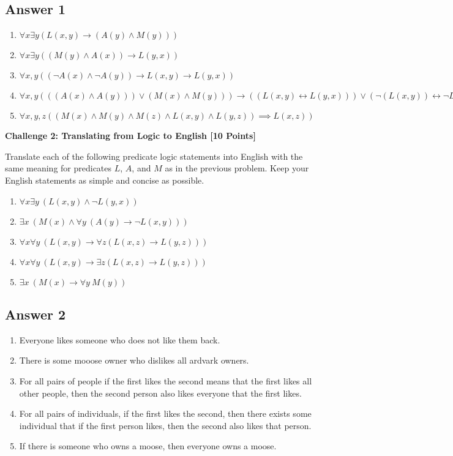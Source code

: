 \documentclass[12pt]{article}
\newcommand{\AND}{\wedge}
\newcommand{\OR}{\vee}
\newcommand{\IMPLIES}{\rightarrow}
\newcommand{\Problem}[3]{\mbox{} \newline \noindent \textbf{\textbf{Challenge #1: #2 [#3 Points] \\ }}}
\begin{document}
\subsection*{Answer 1}
\begin{enumerate}
	\item $\forall x \exists y (L(x,y) \IMPLIES  (A(y) \AND M(y)))$
	\item $\forall x \exists y ((M(y) \AND A(x))\IMPLIES L(y,x))$
	\item $\forall x, y ((\neg A(x) \AND \neg A(y)) \IMPLIES L(x,y) \IMPLIES L(y,x))$
	\item $ \forall x, y (((A(x) \AND A(y))) \OR (M(x) \AND M(y)))\IMPLIES ((L(x,y) \leftrightarrow L(y,x))) \OR (\neg (L(x,y)) \leftrightarrow \neg L(y,x)))$
	\item $ \forall x,y,z ((M(x)\AND M(y)\AND M(z) \AND L(x,y) \AND L(y,z))\implies L(x,z) )$
\end{enumerate}

\Problem{2}{Translating from Logic to English}{10}

Translate each of the following predicate logic statements into English with the same meaning for predicates $L$, $A$, and $M$ as in the previous problem.  Keep your English statements as simple and concise as possible.
\begin{enumerate}
	\item $\forall x \exists y \ (L(x, y) \AND \neg L(y, x))$
	\item $\exists x \ (M(x) \AND \forall y \ (A(y) \IMPLIES \neg L(x, y)))$
	\item $\forall x \forall y \ (L(x, y) \rightarrow \forall z (L(x, z) \rightarrow L(y, z)))$
	\item $\forall x \forall y \ (L(x, y) \rightarrow \exists z (L(x, z) \rightarrow L(y, z)))$
	\item $\exists x \ (M(x) \rightarrow \forall y \ M(y))$
\end{enumerate}

\subsection*{Answer 2}
\begin{enumerate}
	\item Everyone likes someone who does not like them back.
	\item There is some mooose owner who dislikes all ardvark owners.
	\item For all pairs of people if the first likes the second means that the first likes all other people, then the second person also likes everyone that the first likes.
	\item For all pairs of individuals, if the first likes the second, then there exists some individual that if the first person likes, then the second also likes that person.
	\item If there is someone who owns a moose, then everyone owns a moose.
\end{enumerate}
\end{document}
